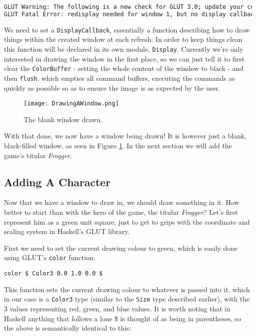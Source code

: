 \documentclass[12pt, a4paper]{report}
\begin{document}
\begin{lstlisting}[language=sh]
GLUT Warning: The following is a new check for GLUT 3.0; update your code.
GLUT Fatal Error: redisplay needed for window 1, but no display callback.
\end{lstlisting}

We need to set a \verb|DisplayCallback|, essentially a function describing how to draw things within the created window at each refresh.
In order to keep things clean this function will be declared in its own module, \verb|Display|.
Currently we're only interested in drawing the window in the first place, so we can just tell it to first clear the \verb|ColorBuffer| - setting the whole content of the window to black - and then \verb|flush|, which empties all command buffers, executing the commands as quickly as possible so as to ensure the image is as expected by the user.

\par

\begin{figure}[ht]
  \centering
  \caption{The blank window drawn.}
  \texttt{[image: DrawingAWindow.png]}
  \label{fig:drawingawindow}
\end{figure}

With that done, we now have a window being drawn!
It is however just a blank, black-filled window, as seen in Figure \ref{fig:drawingawindow}.
In the next section we will add the game's titular \textit{Frogger}.

\subsection{Adding A Character}

Now that we have a window to draw in, we should draw something in it.
How better to start than with the hero of the game, the titular \textit{Frogger}?
Let's first represent him as a green unit square, just to get to grips with the coordinate and scaling system in Haskell's GLUT library.

\par

First we need to set the current drawing colour to green, which is easily done using GLUT's \verb|color| function.

\begin{lstlisting}
color $ Color3 0.0 1.0 0.0 $
\end{lstlisting}

This function sets the current drawing colour to whatever is passed into it, which in our case is a \verb|Color3| type (similar to the \verb|Size| type described earlier), with the 3 values representing red, green, and blue values.
It is worth noting that in Haskell anything that follows a lone \$ is thought of as being in parentheses, so the above is semantically identical to this:
\end{document}
